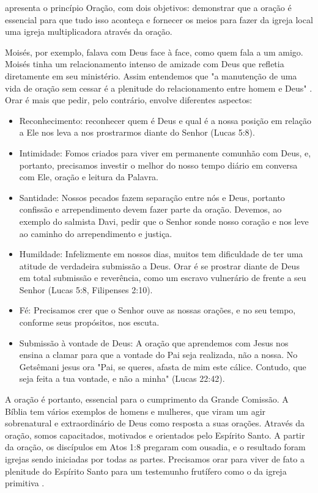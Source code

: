 \documentclass[12pt,openright,oneside,a4paper]{abntex2}
\begin{document}
\begin{citacao}apresenta o princípio Oração, com dois objetivos: demonstrar que a oração é essencial para que tudo isso aconteça e fornecer os meios para fazer da igreja local uma igreja multiplicadora através da oração\cite[p. 29]{brandao}. \end{citacao}

Moisés, por exemplo, falava com Deus face à face, como quem fala a um amigo. Moisés tinha um relacionamento intenso de amizade com Deus que refletia diretamente em seu ministério. Assim entendemos que "a manutenção de uma vida de oração sem cessar é a plenitude do relacionamento entre homem e Deus" \cite[p. 30]{brandao}. Orar é mais que pedir, pelo contrário, envolve diferentes aspectos:

\begin{itemize}
	\item Reconhecimento: reconhecer quem é Deus e qual é a nossa posição em relação a Ele nos leva a nos prostrarmos diante do Senhor (Lucas 5:8).
	\item Intimidade: Fomos criados para viver em permanente comunhão com Deus, e, portanto, precisamos investir o melhor do nosso tempo diário em conversa com Ele, oração e leitura da Palavra.
	\item Santidade: Nossos pecados fazem separação entre nós e Deus, portanto confissão e arrependimento devem fazer parte da oração. Devemos, ao exemplo do salmista Davi, pedir que o Senhor sonde nosso coração e nos leve ao caminho do arrependimento e justiça.
	\item Humildade: Infelizmente em nossos dias, muitos tem dificuldade de ter uma atitude de verdadeira submissão a Deus. Orar é se prostrar diante de Deus em total submissão e reverência, como um escravo vulnerário de frente a seu Senhor (Lucas 5:8, Filipenses 2:10).
	\item Fé: Precisamos crer que o Senhor ouve as nossas orações, e no seu tempo, conforme seus propósitos, nos escuta.
	\item Submissão à vontade de Deus: A oração que aprendemos com Jesus nos ensina a clamar para que a vontade do Pai seja realizada, não a nossa. No Getsêmani jesus ora "Pai, se queres, afasta de mim este cálice. Contudo, que seja feita a tua vontade, e não a minha" (Lucas 22:42).

	\cite[p. 30,31]{brandao}  
\end{itemize}

  A oração é portanto, essencial para o cumprimento da Grande Comissão. A Bíblia tem vários exemplos de homens e mulheres, que viram um agir sobrenatural e extraordinário de Deus como resposta a suas orações. Através da oração, somos capacitados, motivados e orientados pelo Espírito Santo. A partir da oração, os discípulos em Atos 1:8 pregaram com ousadia, e o resultado foram igrejas sendo iniciadas por todas as partes. Precisamos orar para viver de fato a plenitude do Espírito Santo para um testemunho frutífero como o da igreja primitiva \cite[p. 32]{brandao}.
\end{document}
